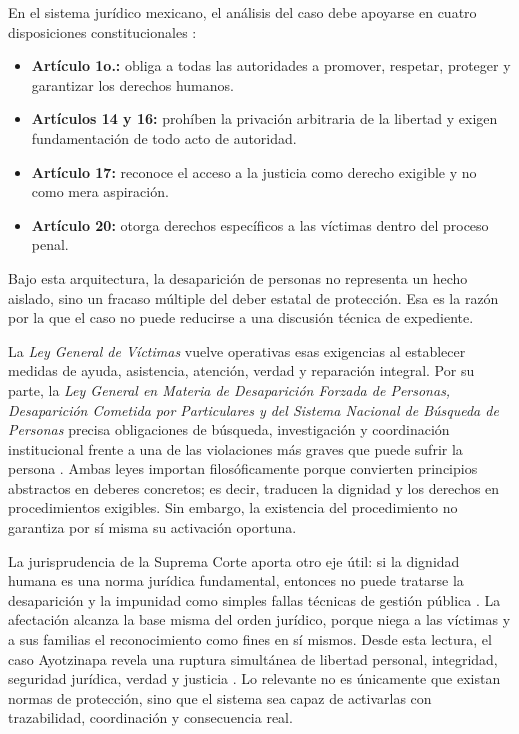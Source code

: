 \documentclass[
	spanish,
	letterpaper, oneside
]{article}
\begin{document}
En el sistema jurídico mexicano, el análisis del caso debe apoyarse en cuatro disposiciones constitucionales \citep{cpeum2026}:

\begin{itemize}
  \item \textbf{Artículo 1o.:} obliga a todas las autoridades a promover, respetar, proteger y garantizar los derechos humanos.
  \item \textbf{Artículos 14 y 16:} prohíben la privación arbitraria de la libertad y exigen fundamentación de todo acto de autoridad.
  \item \textbf{Artículo 17:} reconoce el acceso a la justicia como derecho exigible y no como mera aspiración.
  \item \textbf{Artículo 20:} otorga derechos específicos a las víctimas dentro del proceso penal.
\end{itemize}

Bajo esta arquitectura, la desaparición de personas no representa un hecho aislado, sino un fracaso múltiple del deber estatal de protección. Esa es la razón por la que el caso no puede reducirse a una discusión técnica de expediente.

La \textit{Ley General de Víctimas} vuelve operativas esas exigencias al establecer medidas de ayuda, asistencia, atención, verdad y reparación integral. Por su parte, la \textit{Ley General en Materia de Desaparición Forzada de Personas, Desaparición Cometida por Particulares y del Sistema Nacional de Búsqueda de Personas} precisa obligaciones de búsqueda, investigación y coordinación institucional frente a una de las violaciones más graves que puede sufrir la persona \citep{LeyGeneralVictimas,lgmdfp2026}. Ambas leyes importan filosóficamente porque convierten principios abstractos en deberes concretos; es decir, traducen la dignidad y los derechos en procedimientos exigibles. Sin embargo, la existencia del procedimiento no garantiza por sí misma su activación oportuna.

La jurisprudencia de la Suprema Corte aporta otro eje útil: si la dignidad humana es una norma jurídica fundamental, entonces no puede tratarse la desaparición y la impunidad como simples fallas técnicas de gestión pública \citep{scjnJur37_2016}. La afectación alcanza la base misma del orden jurídico, porque niega a las víctimas y a sus familias el reconocimiento como fines en sí mismos. Desde esta lectura, el caso Ayotzinapa revela una ruptura simultánea de libertad personal, integridad, seguridad jurídica, verdad y justicia \citep{casoAyotzinapaCNDH2024}. Lo relevante no es únicamente que existan normas de protección, sino que el sistema sea capaz de activarlas con trazabilidad, coordinación y consecuencia real.
\end{document}
